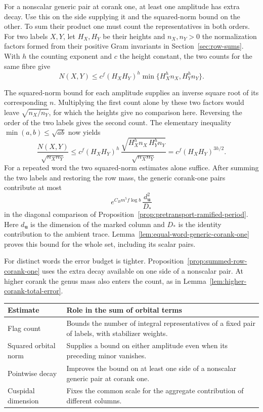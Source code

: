 For a nonscalar generic pair at corank one, at least one amplitude has extra decay. Use this on the side supplying it and the squared-norm bound on the other. To sum their product one must count the representatives in both orders. For two labels \(X,Y\), let \(H_X,H_Y\) be their heights and \(n_X,n_Y>0\) the normalization factors formed from their positive Gram invariants in Section~\ref{sec:row-sums}. With \(h\) the counting exponent and \(c\) the height constant, the two counts for the same fibre give
\[
       N(X,Y)\le c^f(H_XH_Y)^h
                    \min\{H_X^h n_X,H_Y^h n_Y\}.
\]

The squared-norm bound for each amplitude supplies an inverse square root of its corresponding \(n\). Multiplying the first count alone by these two factors would leave \(\sqrt{n_X/n_Y}\), for which the heights give no comparison here. Reversing the order of the two labels gives the second count. The elementary inequality \(\min(a,b)\le\sqrt{ab}\) now yields
\[
 \frac{N(X,Y)}{\sqrt{n_Xn_Y}}
      \le c^f(H_XH_Y)^h\,
          \frac{\sqrt{H_X^h n_X\, H_Y^h n_Y}}{\sqrt{n_Xn_Y}}
      =c^f(H_XH_Y)^{3h/2}.
\]
For a repeated word the two squared-norm estimates alone suffice.
After summing the two labels and restoring the row mass, the
generic corank-one pairs contribute at most
\[
          e^{C_Bm^5 f\log b}\,\frac{d_{\mathbf u}^2}{D_*}
\]
in the diagonal comparison of Proposition~\ref{prop:pretransport-ramified-period}.
Here \(d_{\mathbf u}\) is the dimension of the marked column and \(D_*\)
is the identity contribution to the ambient trace.
Lemma~\ref{lem:equal-word-generic-corank-one} proves this bound for the
whole set, including its scalar pairs.

For distinct words the error budget is tighter. Proposition~\ref{prop:summed-row-corank-one}
uses the extra decay available on one side of a nonscalar pair. At higher
corank the genus mass also enters the count, as in
Lemma~\ref{lem:higher-corank-total-error}.

\begin{construction}
\begin{tabular}{@{}>{\raggedright\arraybackslash}p{.29\linewidth}>{\raggedright\arraybackslash}p{.62\linewidth}@{}}
\toprule
Estimate & Role in the sum of orbital terms \\
\midrule
Flag count & Bounds the number of integral representatives of a fixed pair of labels, with stabilizer weights.\\
Squared orbital norm & Supplies a bound on either amplitude even when its preceding minor vanishes.\\
Pointwise decay & Improves the bound on at least one side of a nonscalar generic pair at corank one.\\
Cuspidal dimension & Fixes the common scale for the aggregate contribution of different columns.\\
\bottomrule
\end{tabular}
\caption{From the local orbital estimates to the rank of the joint period image.}\label{fig:intro-gram-estimates}
\end{construction}

